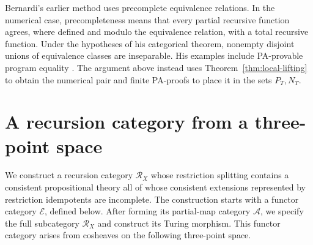 \documentclass[11pt]{article}
\begin{document}
Bernardi's earlier method uses precomplete equivalence relations.
In the numerical case, precompleteness means that every partial
recursive function agrees, where defined and modulo the equivalence
relation, with a total recursive function. Under the hypotheses of
his categorical theorem, nonempty disjoint unions of equivalence
classes are inseparable. His examples include PA-provable program
equality \cite[pp.~125--128]{Bernardi}. The argument above instead
uses Theorem~\ref{thm:local-lifting} to obtain the numerical pair and
finite PA-proofs to place it in the sets $P_T,N_T$.

\section{A recursion category from a three-point space}\label{sec:cosheaves}

We construct a recursion category $\mathscr R_X$ whose restriction
splitting contains a consistent propositional theory all of whose
consistent extensions represented by restriction idempotents are
incomplete. The construction
starts with a functor category $\mathcal E$, defined below.
After forming its partial-map category $\mathcal A$, we specify the
full subcategory $\mathscr R_X$ and construct its Turing morphism.
This functor category arises from cosheaves on the following
three-point space.
\end{document}
